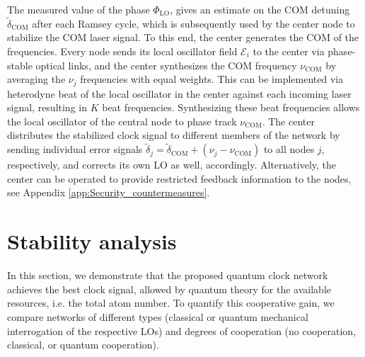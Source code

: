 The measured value of the phase  $\Phi_\mathrm{LO}$,
gives an estimate on the COM detuning
$\tilde\delta_\mathrm{COM}$ after each Ramsey cycle, which is subsequently used
by the center node to stabilize the COM laser signal.
To this end, the center generates the COM of the frequencies. Every node sends
its local oscillator field $\mathcal{E}_i$ to the center via phase-stable
optical links, and the center synthesizes the COM frequency $\nu_\mathrm{COM}$ by
averaging the $\nu_j$ frequencies with equal weights.
This can be implemented via heterodyne beat of the local oscillator in the
center against each incoming laser signal, resulting in $K$ beat frequencies.
Synthesizing  these beat frequencies allows the
local oscillator of the central node to phase track $\nu_\mathrm{COM}$.
The center distributes the stabilized clock signal to different members of the network by sending individual error
signals $\tilde \delta_j = \tilde \delta_\mathrm{COM} + (\nu_j - \nu_\mathrm{COM})$
to all nodes $j$, respectively, and corrects its own LO as well, accordingly.
Alternatively, the center can be operated to provide restricted feedback
information to the nodes, see Appendix \ref{app:Security_countermeasures}.



\section{Stability analysis}
\label{sec:comp}

In this section, we demonstrate that the proposed quantum clock network achieves
the best clock signal, allowed by quantum theory for the available resources, i.e.
the total atom number. 
To quantify this cooperative gain, we compare
networks of different types (classical or quantum mechanical interrogation of
the respective LOs) and degrees of cooperation (no cooperation, classical, or
quantum cooperation).


